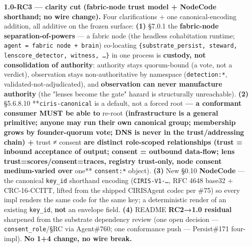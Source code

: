 \documentclass[11pt]{article}
\begin{document}
\textbf{1.0-RC3 — clarity cut (fabric-node trust model + NodeCode shorthand; no wire change).} Four clarifications + one canonical-encoding addition, all additive on the frozen surface: \textbf{(1)} §7.0.1 the \textbf{fabric-node separation-of-powers} — a fabric node (the headless cohabitation runtime; \texttt{agent = fabric node + brain}) co-locating \texttt{\{substrate\_persist, steward, lenscore\_detector, witness, …\}} in one process is \textbf{custody, not consolidation of authority}: authority stays quorum-bound (a vote, not a verdict), observation stays non-authoritative by namespace (\texttt{detection:*}, validated-not-adjudicated), and \textbf{observation can never manufacture authority} (the "lenses become the gate" hazard is structurally unreachable). \textbf{(2)} §5.6.8.10 **\texttt{ciris-canonical} is a default, not a forced root\textbf{ — a conformant consumer MUST be able to }re-root\textbf{ (infrastructure is a general primitive; anyone may run their own canonical group; membership grows by founder-quorum vote; DNS is never in the trust/addressing chain) + }trust ≠ consent\textbf{ are distinct role-scoped relationships (trust = inbound acceptance of output; consent = outbound data-flow; lens trust=scores/consent=traces, registry trust-only, node consent medium-varied over }one** \texttt{consent:*} object). \textbf{(3)} New §0.10 \textbf{NodeCode} — the canonical \texttt{key\_id} shorthand encoding (\texttt{CIRIS-V1-…}, RFC 4648 base32 + CRC-16-CCITT, lifted from the shipped CIRISAgent codec per \#75) so every impl renders the same code for the same key; a deterministic render of an existing \texttt{key\_id}, \textbf{not} an envelope field. \textbf{(4)} README \textbf{RC2→1.0 residual} sharpened from the substrate dependency review (one open decision — \texttt{consent\_role}/§RC via Agent\#760; one conformance push — Persist\#171 four-impl). \textbf{No 1+4 change, no wire break.}
\end{document}
